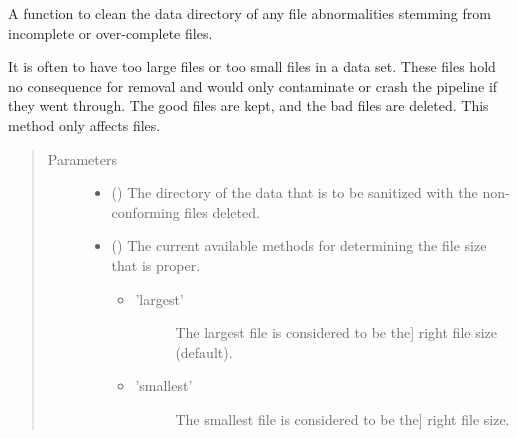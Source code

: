 \documentclass[letterpaper,10pt,english]{sphinxmanual}
\begin{document}
\begin{fulllineitems}
\label{\detokenize{python_docstrings/IfA_Smeargle.bravo.input_sanitization:IfA_Smeargle.bravo.input_sanitization.same_file_size_sanitization}}
A function to clean the data directory of any file abnormalities
stemming from incomplete or over-complete files.

It is often to have too large files or too small files in a data set.
These files hold no consequence for removal and would only contaminate or
crash the pipeline if they went through. The good files are kept, and the
bad files are deleted. This method only affects  files.
\begin{quote}\begin{description}
\item[{Parameters}] \leavevmode\begin{itemize}
\item {} 
 () \textendash{} The directory of the data that is to be sanitized with the
non-conforming files deleted.

\item {} 
 (\sphinxstyleliteralemphasis{\sphinxupquote{ (}}\sphinxstyleliteralemphasis{\sphinxupquote{)}}) \textendash{} 
The current available methods for determining the file size that is
proper.
\begin{itemize}
\item {} \begin{description}
\item[{’largest’}] \leavevmode{[}The largest  file is considered to be the{]}
right file size (default).

\end{description}

\item {} \begin{description}
\item[{’smallest’}] \leavevmode{[}The smallest  file is considered to be the{]}
right file size.


\end{description}
\end{itemize}
\end{itemize}
\end{description}
\end{quote}
\end{fulllineitems}
\end{document}
